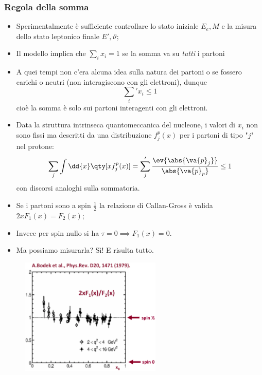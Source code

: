 \subsubsection{Regola della somma}
\begin{itemize}
    \item Sperimentalmente è sufficiente controllare lo stato iniziale $E_{e},M$ e la misura dello stato leptonico finale $E',\vartheta$;
    \item Il modello implica che $\sum_i x_i=1$ se la somma va su \textit{tutti} i partoni
    \item A quei tempi non c'era alcuna idea sulla natura dei partoni o se fossero carichi o neutri (non interagiscono con gli elettroni), dunque
    \begin{equation*}
    \sum_i'x_i\leq1
    \end{equation*}
    cioè la somma è solo sui partoni interagenti con gli elettroni.
    \item Data la struttura intrinseca quantomeccanica del nucleone, i valori di $x_i$ non sono fissi ma descritti da una distribuzione $f_j^p(x)$ per i partoni di tipo "$j$" nel protone:
    \begin{equation*}
    \sum_j\int\dd{x}\qty[xf_j^p(x)]=\sum_j'\frac{\ev{\abs{\va{p}_j}}}{\abs{\va{p}_p}}\leq1
    \end{equation*}
    con discorsi analoghi sulla sommatoria.
    \item Se i partoni sono a spin $\frac12$ la relazione di Callan-Gross è valida $2xF_1(x)=F_2(x)$;
    \item Invece per spin nullo si ha $\tau=0\implies F_1(x)=0$.
    \item Ma possiamo misurarla? Sì! E risulta tutto.
\end{itemize}
\begin{figure}[H]
    \centering
    \includegraphics[width=0.6\textwidth]{immagini/fig_callan_gross_experimental.png}
\end{figure}

